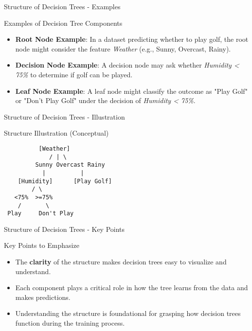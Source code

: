 \documentclass[aspectratio=169]{beamer}
\begin{document}
\begin{frame}[fragile]{Structure of Decision Trees - Examples}
    \begin{block}{Examples of Decision Tree Components}
        \begin{itemize}
            \item \textbf{Root Node Example}: In a dataset predicting whether to play golf, the root node might consider the feature \textit{Weather} (e.g., Sunny, Overcast, Rainy).
            
            \item \textbf{Decision Node Example}: A decision node may ask whether \textit{Humidity < 75\%} to determine if golf can be played.

            \item \textbf{Leaf Node Example}: A leaf node might classify the outcome as "Play Golf" or "Don't Play Golf" under the decision of \textit{Humidity < 75\%}.
        \end{itemize}
    \end{block}
\end{frame}

\begin{frame}[fragile]{Structure of Decision Trees - Illustration}
    \begin{block}{Structure Illustration (Conceptual)}
        \begin{verbatim}
          [Weather]
             / | \
         Sunny Overcast Rainy
           |          |
    [Humidity]      [Play Golf]
        / \
   <75%  >=75%
    /       \
 Play     Don't Play
        \end{verbatim}
    \end{block}
\end{frame}

\begin{frame}[fragile]{Structure of Decision Trees - Key Points}
    \begin{block}{Key Points to Emphasize}
        \begin{itemize}
            \item The \textbf{clarity} of the structure makes decision trees easy to visualize and understand.
            \item Each component plays a critical role in how the tree learns from the data and makes predictions.
            \item Understanding the structure is foundational for grasping how decision trees function during the training process.
        \end{itemize}
    \end{block}
\end{frame}
\end{document}
